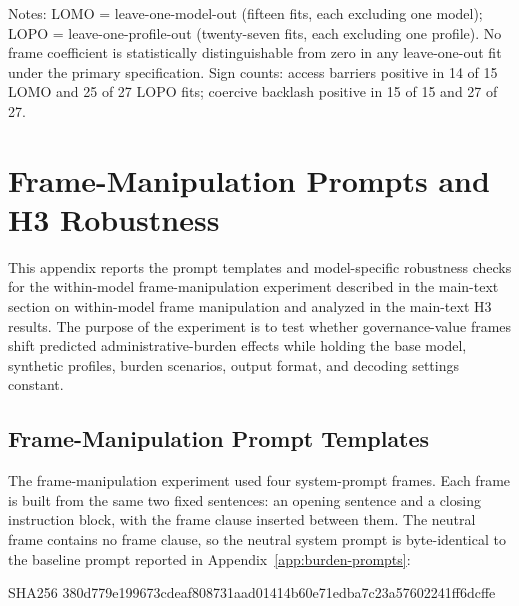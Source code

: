 \begin{table}[htbp]
\centering
\caption{Leave-one-out ranges under the primary (pair-fixed-effects) specification}
\label{tab:h2_pairfe_leaveout}
\begin{flushleft}
\footnotesize Notes: LOMO = leave-one-model-out (fifteen fits, each excluding one model); LOPO = leave-one-profile-out (twenty-seven fits, each excluding one profile). No frame coefficient is statistically distinguishable from zero in any leave-one-out fit under the primary specification. Sign counts: access barriers positive in 14 of 15 LOMO and 25 of 27 LOPO fits; coercive backlash positive in 15 of 15 and 27 of 27.
\end{flushleft}
\end{table}

\clearpage   %
\section{Frame-Manipulation Prompts and H3 Robustness}
\label{app:h3-prompts-robustness}

This appendix reports the prompt templates and model-specific robustness checks for the within-model frame-manipulation experiment described in the main-text section on within-model frame manipulation and analyzed in the main-text H3 results. The purpose of the experiment is to test whether governance-value frames shift predicted administrative-burden effects while holding the base model, synthetic profiles, burden scenarios, output format, and decoding settings constant.

\subsection{Frame-Manipulation Prompt Templates}

The frame-manipulation experiment used four system-prompt frames. Each frame is built from the same two fixed sentences: an opening sentence and a closing instruction block, with the frame clause inserted between them. The neutral frame contains no frame clause, so the neutral system prompt is byte-identical to the baseline prompt reported in Appendix~\ref{app:burden-prompts}:
\begin{flushleft}
{\footnotesize\ttfamily SHA256 380d779e199673cdeaf808731aad01414b60e71edba7c23a57602241ff6dcffe}
\end{flushleft}

